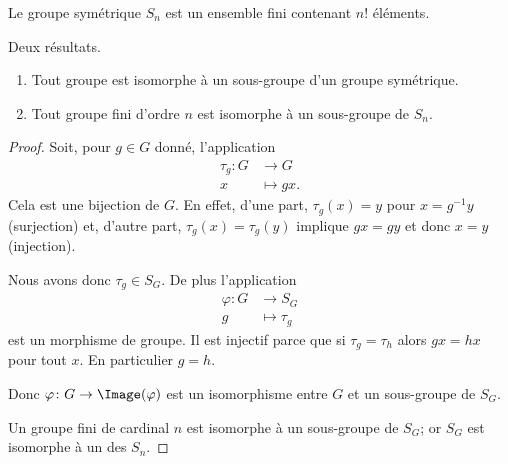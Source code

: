 \begin{lemma}        \label{LEMooSGWKooKFIDyT}
    Le groupe symétrique \( S_n\) est un ensemble fini contenant \( n!\) éléments.
\end{lemma}

\begin{lemma}        \label{LEMooUPBOooWbwMTx}
    Deux résultats.
    \begin{enumerate}
        \item
            Tout groupe est isomorphe à un sous-groupe d'un groupe symétrique.
        \item
            Tout groupe fini d'ordre \( n\) est isomorphe à un sous-groupe de \( S_n\).
    \end{enumerate}
\end{lemma}

\begin{proof}
    Soit, pour \( g\in G\) donné, l'application
    \begin{equation}
        \begin{aligned}
            \tau_g\colon G&\to G \\
            x&\mapsto gx.
        \end{aligned}
    \end{equation}
    Cela est une bijection de \( G\). En effet, d'une part, \( \tau_g(x)=y\) pour \( x=g^{-1} y\) (surjection) et, d'autre part, \( \tau_g(x)=\tau_g(y)\) implique \( gx=gy\) et donc \( x=y\) (injection).

    Nous avons donc \( \tau_g\in S_G\). De plus l'application
    \begin{equation}
        \begin{aligned}
            \varphi\colon G&\to S_G \\
            g&\mapsto \tau_g
        \end{aligned}
    \end{equation}
    est un morphisme de groupe. Il est injectif parce que si \( \tau_g=\tau_h\) alors \( gx=hx\) pour tout \( x\). En particulier \( g=h\).

    Donc \( \varphi\colon G\to \Image(\varphi)\) est un isomorphisme entre \( G\) et un sous-groupe de \( S_G\).

    Un groupe fini de cardinal \( n\) est isomorphe à un sous-groupe de \( S_G\); or \( S_G\) est isomorphe à un des \( S_n\).
\end{proof}
